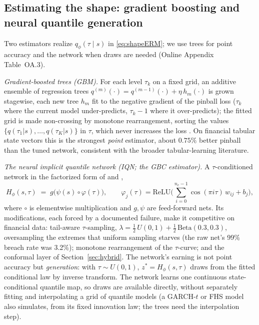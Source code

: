 \documentclass[11pt]{article}
\theoremstyle{remark}
\begin{document}
\subsection{Estimating the shape: gradient boosting and neural quantile
generation}\label{sec:gbcmethod}

Two estimators realize $q_\phi(\tau\mid s)$ in \eqref{eq:shapeERM}; we
use trees for point accuracy and the network when draws are needed
(Online Appendix Table~OA.3).

\emph{Gradient-boosted trees (GBM).} For each level $\tau_k$ on a fixed
grid, an additive ensemble of regression trees
$q^{(m)}(\cdot) = q^{(m-1)}(\cdot) + \eta\, h_m(\cdot)$ is grown
stagewise, each new tree $h_m$ fit to the negative gradient of the
pinball loss ($\tau_k$ where the current model under-predicts,
$\tau_k - 1$ where it over-predicts); the fitted grid is made non-crossing by monotone rearrangement, sorting the values
$\{q(\tau_1|s),\dots,q(\tau_K|s)\}$ in $\tau$, which never increases the
loss \citep{cherno2010rearr}. On financial tabular state
vectors this is the strongest \emph{point} estimator, about $0.75\%$ better pinball than the tuned network, consistent with the broader
tabular-learning literature.

\emph{The neural implicit quantile network (IQN; the GBC estimator).} A
$\tau$-conditioned network
in the factorized form of \citet{dabney2018iqn} and
\citet{polson2023gbc},
\begin{equation}
H_\phi(s,\tau) \;=\; g\big(\psi(s)\circ\varphi(\tau)\big),
\qquad
\varphi_j(\tau) = \mathrm{ReLU}\Big(\textstyle\sum_{i=0}^{n_c-1}
\cos(\pi i \tau)\, w_{ij} + b_j\Big),
\label{eq:iqn}
\end{equation}
where $\circ$ is elementwise multiplication and $g,\psi$ are
feed-forward nets. Its modifications, each forced by a documented
failure, make it competitive on financial data: tail-aware
$\tau$-sampling, $\lambda = \tfrac12\,U(0,1) +
\tfrac12\,\mathrm{Beta}(0.3,0.3)$, oversampling the extremes that
uniform sampling starves (the raw net's 99\% breach rate was 3.2\%);
monotone rearrangement of the $\tau$-curve; and the conformal layer of
Section~\ref{sec:hybrid}. The network's earning is not point accuracy
but \emph{generation}: with $\tau\sim U(0,1)$,
$z^{*} = H_\phi(s,\tau)$ draws from the fitted conditional law by
inverse transform. The network learns one continuous
state-conditional quantile map, so draws are available directly,
without separately fitting and interpolating a grid of quantile
models (a GARCH-$t$ or FHS model also simulates, from its fixed
innovation law; the trees need the interpolation step).
\end{document}
